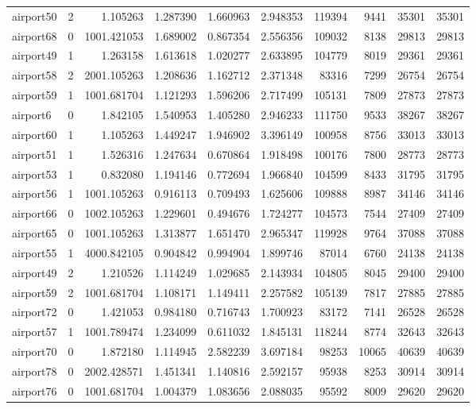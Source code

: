 \begin{longtable}{|l|r|r|r|r|r|r|r|r|r|}
airport50 & 2 & 1.105263 & 1.287390 & 1.660963 & 2.948353 & 119394 & 9441 & 35301 & 35301 \\
airport68 & 0 & 1001.421053 & 1.689002 & 0.867354 & 2.556356 & 109032 & 8138 & 29813 & 29813 \\
airport49 & 1 & 1.263158 & 1.613618 & 1.020277 & 2.633895 & 104779 & 8019 & 29361 & 29361 \\
airport58 & 2 & 2001.105263 & 1.208636 & 1.162712 & 2.371348 & 83316 & 7299 & 26754 & 26754 \\
airport59 & 1 & 1001.681704 & 1.121293 & 1.596206 & 2.717499 & 105131 & 7809 & 27873 & 27873 \\
airport6 & 0 & 1.842105 & 1.540953 & 1.405280 & 2.946233 & 111750 & 9533 & 38267 & 38267 \\
airport60 & 1 & 1.105263 & 1.449247 & 1.946902 & 3.396149 & 100958 & 8756 & 33013 & 33013 \\
airport51 & 1 & 1.526316 & 1.247634 & 0.670864 & 1.918498 & 100176 & 7800 & 28773 & 28773 \\
airport53 & 1 & 0.832080 & 1.194146 & 0.772694 & 1.966840 & 104599 & 8433 & 31795 & 31795 \\
airport56 & 1 & 1001.105263 & 0.916113 & 0.709493 & 1.625606 & 109888 & 8987 & 34146 & 34146 \\
airport66 & 0 & 1002.105263 & 1.229601 & 0.494676 & 1.724277 & 104573 & 7544 & 27409 & 27409 \\
airport65 & 0 & 1001.105263 & 1.313877 & 1.651470 & 2.965347 & 119928 & 9764 & 37088 & 37088 \\
airport55 & 1 & 4000.842105 & 0.904842 & 0.994904 & 1.899746 & 87014 & 6760 & 24138 & 24138 \\
airport49 & 2 & 1.210526 & 1.114249 & 1.029685 & 2.143934 & 104805 & 8045 & 29400 & 29400 \\
airport59 & 2 & 1001.681704 & 1.108171 & 1.149411 & 2.257582 & 105139 & 7817 & 27885 & 27885 \\
airport72 & 0 & 1.421053 & 0.984180 & 0.716743 & 1.700923 & 83172 & 7141 & 26528 & 26528 \\
airport57 & 1 & 1001.789474 & 1.234099 & 0.611032 & 1.845131 & 118244 & 8774 & 32643 & 32643 \\
airport70 & 0 & 1.872180 & 1.114945 & 2.582239 & 3.697184 & 98253 & 10065 & 40639 & 40639 \\
airport78 & 0 & 2002.428571 & 1.451341 & 1.140816 & 2.592157 & 95938 & 8253 & 30914 & 30914 \\
airport76 & 0 & 1001.681704 & 1.004379 & 1.083656 & 2.088035 & 95592 & 8009 & 29620 & 29620 \\

\end{longtable}
